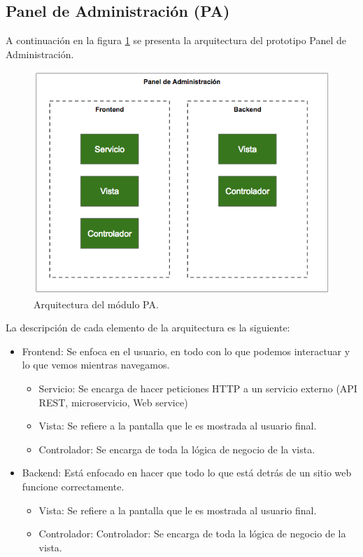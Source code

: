 \subsection{Panel de Administración (PA)}
A continuación en la figura \ref{image:arquitecturaPA} se presenta la arquitectura del prototipo Panel de Administración.
\FloatBarrier
\begin{figure}[htbp!]
		\centering
			\includegraphics[width=.9 \textwidth]{imagenes/Arquitecturas/arquiRuben}
		\caption{Arquitectura del módulo PA. }
		\label{image:arquitecturaPA}
\end{figure}
\FloatBarrier
La descripción de cada elemento de la arquitectura es la siguiente:
\begin{itemize}
\item Frontend: Se enfoca en el usuario, en todo con lo que podemos interactuar y lo que vemos mientras navegamos.
\begin{itemize}
\item Servicio: Se encarga de hacer peticiones HTTP a un servicio externo (API REST, microservicio, Web service)
\item Vista: Se refiere a la pantalla que le es mostrada al usuario final.
\item Controlador: Se encarga de toda la lógica de negocio de la vista.
\end{itemize}
\item Backend: Está enfocado en hacer que todo lo que está detrás de un sitio web funcione correctamente.
\begin{itemize}
\item Vista: Se refiere a la pantalla que le es mostrada al usuario final.
\item Controlador: Controlador: Se encarga de toda la lógica de negocio de la vista.
\end{itemize}
\end{itemize}


